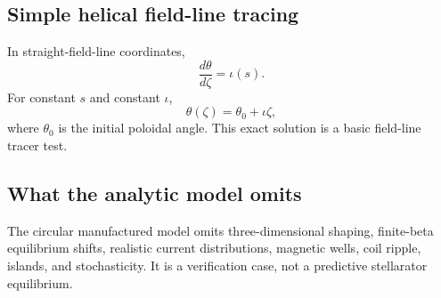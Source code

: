 \subsection{Simple helical field-line tracing}
In straight-field-line coordinates,
\begin{equation}
\frac{d\theta}{d\zeta}=\iota(s).
\end{equation}
For constant $s$ and constant $\iota$,
\begin{equation}
\theta(\zeta)=\theta_0+\iota\zeta,
\label{eq:field_line_solution}
\end{equation}
where $\theta_0$ is the initial poloidal angle. This exact solution is a basic field-line tracer test.

\subsection{What the analytic model omits}
The circular manufactured model omits three-dimensional shaping, finite-beta equilibrium shifts, realistic current distributions, magnetic wells, coil ripple, islands, and stochasticity. It is a verification case, not a predictive stellarator equilibrium.

